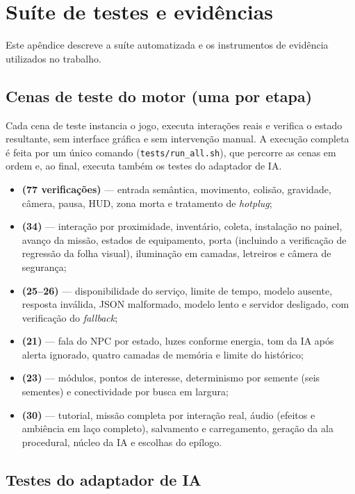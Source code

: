 \chapter{Suíte de testes e evidências}
\label{ap:testes}

Este apêndice descreve a suíte automatizada e os instrumentos de evidência
utilizados no trabalho.

\section*{Cenas de teste do motor (uma por etapa)}
\label{ap:cenas}

Cada cena de teste instancia o jogo, executa interações reais e verifica o
estado resultante, sem interface gráfica e sem intervenção manual. A
execução completa é feita por um único comando
(\texttt{tests/run\_all.sh}), que percorre as cenas em ordem e, ao final,
executa também os testes do adaptador de IA.

\begin{itemize}
  \item \textbf{ (77 verificações)} --- entrada semântica, movimento,
  colisão, gravidade, câmera, pausa, HUD, zona morta e tratamento de
  \emph{hotplug};
  \item \textbf{ (34)} --- interação por proximidade, inventário,
  coleta, instalação no painel, avanço da missão, estados de equipamento,
  porta (incluindo a verificação de regressão da folha visual), iluminação em
  camadas, letreiros e câmera de segurança;
  \item \textbf{ (25--26)} --- disponibilidade do serviço, limite de
  tempo, modelo ausente, resposta inválida, JSON malformado, modelo lento e
  servidor desligado, com verificação do \emph{fallback};
  \item \textbf{ (21)} --- fala do NPC por estado, luzes conforme
  energia, tom da IA após alerta ignorado, quatro camadas de memória e limite
  do histórico;
  \item \textbf{ (23)} --- módulos, pontos de interesse, determinismo
  por semente (seis sementes) e conectividade por busca em largura;
  \item \textbf{ (30)} --- tutorial, missão completa por interação
  real, áudio (efeitos e ambiência em laço completo), salvamento e
  carregamento, geração da ala procedural, núcleo da IA e escolhas do
  epílogo.
\end{itemize}

\section*{Testes do adaptador de IA}
\label{ap:adapter}

